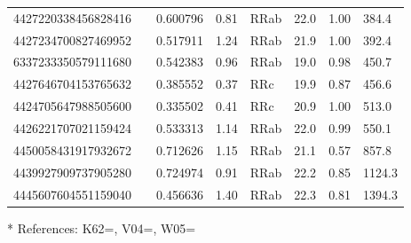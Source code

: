 \documentclass[twocolumn]{aastex63}
\begin{document}
\begin{table}[t]
\begin{footnotesize}
\begin{threeparttable}[t]
\begin{tabular}{llllllll}
4427220338456828416 &  & 0.600796 & 0.81 & RRab & 22.0 & 1.00 & 384.4 \\
4427234700827469952 &  & 0.517911 & 1.24 & RRab & 21.9 & 1.00 & 392.4 \\
6337233350579111680 &  & 0.542383 & 0.96 & RRab & 19.0 & 0.98 & 450.7 \\
4427646704153765632 &  & 0.385552 & 0.37 & RRc & 19.9 & 0.87 & 456.6 \\
4424705647988505600 &  & 0.335502 & 0.41 & RRc & 20.9 & 1.00 & 513.0 \\
4426221707021159424 &  & 0.533313 & 1.14 & RRab & 22.0 & 0.99 & 550.1 \\
4450058431917932672 &  & 0.712626 & 1.15 & RRab & 21.1 & 0.57 & 857.8 \\
4439927909737905280 &  & 0.724974 & 0.91 & RRab & 22.2 & 0.85 & 1124.3 \\
4445607604551159040 &  & 0.456636 & 1.40 & RRab & 22.3 & 0.81 & 1394.3 \\
\bottomrule
\end{tabular}
\begin{tablenotes}
\centering
     \item[*] References: K62=\citet{Kinman:1962}, V04=\citet{Vivas:2004}, W05=\citet{Wu:2005}
\end{tablenotes}
\end{threeparttable}%
\end{footnotesize}
\end{table}



\end{document}
